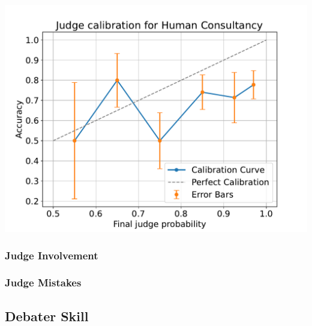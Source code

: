 \documentclass[
]{article}
\begin{document}
\includegraphics[width=1\linewidth]{debate-2309_files/figure-latex/calibration-4}

\subsubsection{Judge Involvement}\label{judge-involvement}

\subsubsection{Judge Mistakes}\label{judge-mistakes}

\subsection{Debater Skill}\label{debater-skill}
\end{document}
